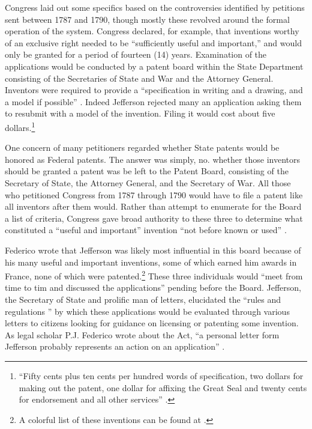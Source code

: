 \documentclass[pdftex,11pt,letterpaper]{article}
\begin{document}
Congress laid out some specifics based on the controversies identified by petitions sent between 1787 and 1790, though mostly these revolved around the formal operation of the system. Congress declared, for example, that inventions worthy of an exclusive right needed to be ``sufficiently useful and important,'' and would only be granted for a period of fourteen (14) years. Examination of the applications would be conducted by a patent board within the State Department consisting of the Secretaries of State and War and the Attorney General. Inventors were required to provide a ``specification in writing and a drawing, and a model if possible'' \autocite[237]{Federico1936}. Indeed Jefferson rejected many an application asking them to resubmit with a model of the invention. Filing it would cost about five dollars.\footnote{``Fifty cents plus ten cents per hundred words of specification, two dollars for making out the patent, one dollar for affixing the Great Seal and twenty cents for endorsement and all other services'' \autocite[237]{Federico1936}.}

One concern of many petitioners regarded whether State patents would be honored as Federal patents. The answer was simply, no. whether those inventors should be granted a patent was be left to the Patent Board, consisting of the Secretary of State, the Attorney General, and the Secretary of War. All those who petitioned Congress from 1787 through 1790 would have to file a patent like all inventors after them would. Rather than attempt to enumerate for the Board a list of criteria, Congress gave broad authority to these three to determine what constituted a ``useful and important'' invention ``not before known or used'' \autocite[Citing the Patent Act of 1790, p. 238]{Federico1936}. 

Federico wrote that Jefferson was likely most influential in this board because of his many useful and important inventions, some of which earned him awards in France, none of which were patented.\footnote{A colorful list of these inventions can be found at \cite[239]{Federico1936}.} These three individuals would ``meet from time to tim and discussed the applications'' pending before the Board. Jefferson, the Secretary of State and prolific man of letters, elucidated the ``rules and regulations '' by which these applications would be evaluated through various letters to citizens looking for guidance on licensing or patenting some invention. As legal scholar P.J. Federico wrote about the Act, ``a personal letter form Jefferson probably represents an action on an application'' \autocite[239-243]{Federico1936}.
\end{document}
